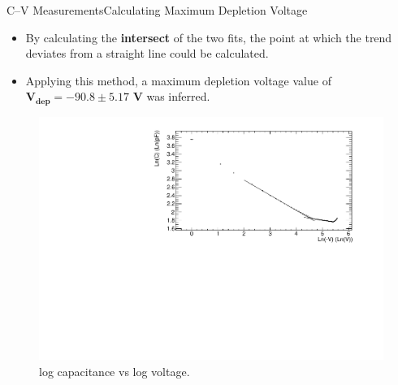 \documentclass{beamer}
\begin{document}
    \begin{frame}{C--V Measurements}{Calculating Maximum Depletion Voltage}
        \begin{itemize}
            \item By calculating the \textbf{intersect} of the two fits, the point at which the trend deviates from a straight line could be calculated.
            \vspace{0.3cm}
            \item Applying this method, a maximum depletion voltage value of $\bm{V_{dep} = -90.8 \pm 5.17}$ \textbf{V} was inferred. 
        \end{itemize}
        \begin{figure}
            \centering
            \includegraphics[width = 0.7\linewidth]{Diode2_nonirradiated_CV_noextrapolation_1711.pdf}
            \vspace{-0.4cm}
            \caption{log capacitance vs log voltage.}
            \label{fig:CVNonIrradiated}
        \end{figure}
    \end{frame}
    
\end{document}
